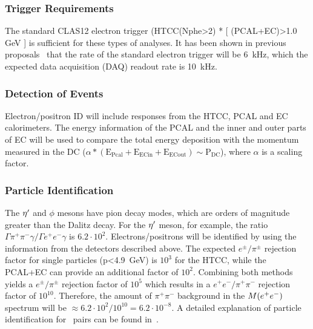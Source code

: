 \subsubsection{Trigger Requirements}
The standard CLAS12 electron trigger (HTCC(Nphe>2) * [ (PCAL+EC)>1.0 GeV ] is sufficient for these types of analyses. It has been shown in previous
proposals~\cite{clas.proposal.meson,clas.proposal.jpsi} that the rate of the standard electron trigger will be 6~kHz, which the expected data acquisition (DAQ) readout rate is 10~kHz.
\subsubsection{Detection of \epemT Events} 
Electron/positron ID will include responses from the HTCC, PCAL and EC calorimeters. The energy information of the PCAL and the inner and outer parts of EC will be used to compare the total energy deposition with the momentum measured in the DC ($\alpha*(\mathrm{E_{Pcal}} + \mathrm{E_{ECin}}+ \mathrm{E_{ECout}}) \sim \mathrm{P_{DC}}$), where $\alpha$ is a scaling factor.
\subsubsection{Particle Identification}
The $\eta^{\prime}$ and $\phi$ mesons have pion decay modes, which are orders of magnitude greater than the Dalitz decay. For the $\eta^{\prime}$ meson, for example, the ratio $\Gamma \pi^+\pi^-\gamma / \Gamma e^+e^- \gamma $ is $ 6.2\cdot 10^2$. 
Electrons/positrons will be identified by using the information from the detectors described above. The expected $e^\pm/\pi^\pm$ rejection factor for single particles (p<4.9~GeV) is $10^3$ for the HTCC, while the PCAL+EC can provide an additional factor of $10^2$. Combining both methods yields a $e^\pm/\pi^\pm$ rejection factor of $10^5$ which results in a $e^+e^-/\pi^+\pi^-$ rejection factor of $10^{10}$. Therefore, the amount of $\pi^+\pi^-$ background in the $M(e^+e^-)$ spectrum will be $\approx 6.2\cdot 10^2/10^{10} = 6.2\cdot10^{-8}$. A detailed explanation of particle identification for \epemT \ pairs can be found in~\cite{clas.proposal.jpsi}.
